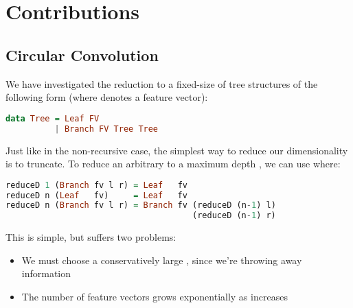\documentclass[]{article}
\begin{document}
\cite{Gartner2003}
\cite{Oveisi.Oveisi.Erfanian.ea:2012}
\cite{bakir2007predicting}
\cite{conf/ijcai/Plate91}
\cite{goller1996learning}
\cite{kwasny1995tail}
\cite{pollack1990recursive}
\cite{zanzotto2012distributed}

\iffalse

Machine learning over structured data:
1D is common: parsing natural language
2D is common; images
Trees are fractal
Backpropagation through structure
LSTM with recursive structure
Most work tries to identify structure; we already have it

Recurrent neural networks
Backpropagation through structure

\fi

\section{Contributions}\label{current}

\subsection{Circular Convolution}\label{circularconvolution}

We have investigated the reduction to a fixed-size of tree structures of the following form (where  denotes a feature vector):

\begin{lstlisting}[language=Haskell, xleftmargin=.2\textwidth, xrightmargin=.2\textwidth]
data Tree = Leaf FV
          | Branch FV Tree Tree
\end{lstlisting}

Just like in the non-recursive case, the simplest way to reduce our dimensionality is to truncate. To reduce an arbitrary  to a maximum depth , we can use  where:

\begin{lstlisting}[language=Haskell, xleftmargin=.2\textwidth, xrightmargin=.2\textwidth]
reduceD 1 (Branch fv l r) = Leaf   fv
reduceD n (Leaf   fv)     = Leaf   fv
reduceD n (Branch fv l r) = Branch fv (reduceD (n-1) l)
                                      (reduceD (n-1) r)
\end{lstlisting}

This is simple, but suffers two problems:

\begin{itemize}
 \item We must choose a conservatively large , since we're throwing away information
 \item The number of feature vectors grows exponentially as  increases
\end{itemize}
\end{document}
